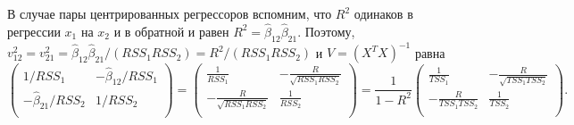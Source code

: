 \documentclass[12pt]{article}
\newcommand{\hb}{\hat{\beta}}
\begin{document}
В случае пары центрированных регрессоров вспомним, что $R^2$ одинаков в регрессии $x_1$ на $x_2$ и в обратной и равен $R^2 = \hb_{12} \hb_{21}$.
Поэтому, $v_{12}^2 = v_{21}^2 = \hb_{12}\hb_{21} / (RSS_1 RSS_2) = R^2 / (RSS_1 RSS_2)$ и $V = (X^TX)^{-1}$ равна
\[
\begin{pmatrix}
    1/RSS_1 & -{\hb_{12}}/{RSS_1} \\
    - {\hb_{21}}/{RSS_2} & 1/RSS_2 \\
\end{pmatrix}  = 
\begin{pmatrix}
    \frac{1}{RSS_1} & -\frac{R}{\sqrt{RSS_1 RSS_2}} \\
    -\frac{R}{\sqrt{RSS_1 RSS_2}} & \frac{1}{RSS_2} \\
\end{pmatrix} = 
\frac{1}{1 - R^2}
\begin{pmatrix}
    \frac{1}{TSS_1} & -\frac{R}{\sqrt{TSS_1 TSS_2}} \\
    -\frac{R}{TSS_1 TSS_2} & \frac{1}{TSS_2} \\
\end{pmatrix}. 
\]
\end{document}
